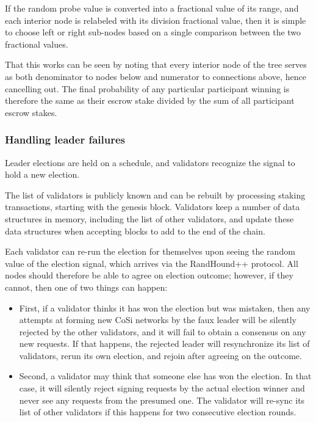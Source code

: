 \documentclass[a4paper, 10pt, conference]{ieeeconf}
\begin{document}
If the random probe value is converted into a fractional value of its range, and each interior node is relabeled with its division fractional value, then it is simple to choose left or right sub-nodes based on a single comparison between the two fractional values.

That this works can be seen by noting that every interior node of the tree serves as both denominator to nodes below and numerator to connections above, hence cancelling out. The final probability of any particular participant winning is therefore the same as their escrow stake divided by the sum of all participant escrow stakes.

\subsubsection{Handling leader failures} Leader elections are held on a schedule, and validators recognize the signal to hold a new election. 

The list of validators is publicly known and can be rebuilt by processing staking transactions, starting with the genesis block. Validators keep a number of data structures in memory, including the list of other validators, and update these data structures when accepting blocks to add to the end of the chain.

Each validator can re-run the election for themselves upon seeing the random value of the election signal, which arrives via the RandHound++ protocol. All nodes should therefore be able to agree on election outcome; however, if they cannot, then one of two things can happen: 

\begin{itemize}
	\item{First, if a validator thinks it has won the election but was mistaken, then any attempts at forming new CoSi networks by the faux leader will be silently rejected by the other validators, and it will fail to obtain a consensus on any new requests. If that happens, the rejected leader will resynchronize its list of validators, rerun its own election, and rejoin after agreeing on the outcome.} 
	\item{Second, a validator may think that someone else has won the election. In that case, it will silently reject signing requests by the actual election winner and never see any requests from the presumed one. The validator will re-sync its list of other validators if this happens for two consecutive election rounds.}
\end{itemize}
\end{document}
